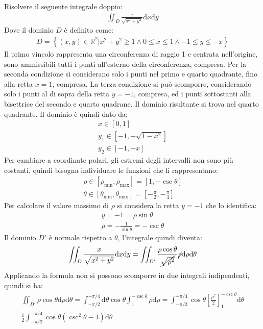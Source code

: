 \documentclass{article}
\newcommand{\df}{\mathrm{d}}
\numberwithin{equation}{subsection}
\begin{document}
Risolvere il seguente integrale doppio:
\begin{gather*}
    \iint_D\frac{x}{\sqrt{x^2+y^2}}\df x\df y
\end{gather*}
Dove il dominio $D$ è definito come:
\begin{gather*}
    D=\left\{(x,y)\in\mathbb{R}^2\big| x^2+y^2\geq 1\land 0\leq x\leq1\land -1\leq y\leq -x\right\}
\end{gather*}
Il primo vincolo rappresenta una circonferenza di raggio 1 e centrata nell'origine, sono ammissibili tutti i punti all'esterno della circonferenza, compresa. 
Per la seconda condizione si considerano solo i punti nel primo e quarto quadrante, fino alla retta $x=1$, compresa.  
La terza condizione si può scomporre, considerando solo i punti al di sopra della retta $y=-1$, compresa, ed i punti sottostanti alla bisettrice del secondo e quarto quadrane. 
Il dominio risultante si trova nel quarto quadrante. 
Il dominio è quindi dato da:
\begin{gather*}
    x\in[0,1]\\
    y_1\in[-1,-\sqrt{1-x^2}]\\
    y_2\in[-1,-x]
\end{gather*}
Per cambiare a coordinate polari, gli estremi degli intervalli non sono più costanti, quindi bisogna individuare le funzioni che li rappresentano:
\begin{gather*}
    \rho\in[\rho_{\min},\rho_{\max}]=[1,-\csc\theta]\\
    \theta\in[\theta_{\min},\theta_{\max}]=\left[-\frac{\pi}{2},-\frac{\pi}{4}\right]
\end{gather*}
Per calcolare il valore massimo di $\rho$ si considera la retta $y=-1$ che lo identifica:
\begin{gather*}
    y=-1=\rho\sin\theta\\
    \rho=-\frac{1}{\sin\theta}=-\csc\theta
\end{gather*}
Il dominio  $D'$ è normale rispetto a $\theta$, l'integrale quindi diventa:
\begin{gather*}
    \iint_D\frac{x}{\sqrt{x^2+y^2}}\df x\df y=
    \iint_{D'}\frac{\rho\cos\theta}{\cancel{\sqrt{\rho^2}}}\cancel{\rho}\df\rho\df\theta
\end{gather*}
Applicando la formula non si possono scomporre in due integrali indipendenti, quindi si ha:
\begin{gather*}
    \iint_{D'}{\rho\cos\theta}\df\rho\df\theta=
    \int_{-\pi/2}^{-\pi/4}\df\theta\cos\theta\int_{1}^{-\csc\theta}\rho\df\rho=
    \int_{-\pi/2}^{-\pi/4}\cos\theta\left[\frac{\rho^2}{2}\right]_{1}^{-\csc\theta}\df\theta\\
    \frac{1}{2}\int_{-\pi/2}^{-\pi/4}\cos\theta\left(\csc^2\theta-1\right)\df\theta
\end{gather*}
\end{document}
